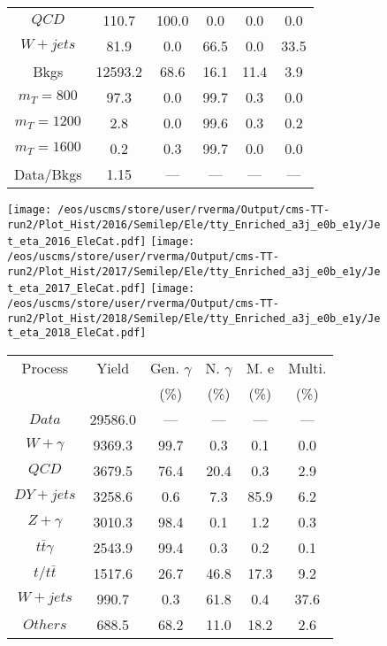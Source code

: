 \begin{figure}
\begin{minipage}[c]{0.32\textwidth}
{\begin{tabular}{cccccc}
$ QCD $ &  110.7 &  100.0 &  0.0 &  0.0 &  0.0\\
$ W+jets $ &  81.9 &  0.0 &  66.5 &  0.0 &  33.5\\
Bkgs &  12593.2 &  68.6 &  16.1 &  11.4 &  3.9\\
$ m_{T} = 800 $ &  97.3 &  0.0 &  99.7 &  0.3 &  0.0\\
$ m_{T} = 1200 $ &  2.8 &  0.0 &  99.6 &  0.3 &  0.2\\
$ m_{T} = 1600 $ &  0.2 &  0.3 &  99.7 &  0.0 &  0.0\\
Data/Bkgs &  1.15 &  --- &  --- &  --- &  ---\\
\hline
\end{tabular}
}
\end{minipage}
\end{figure}

\begin{figure}
\centering
\texttt{[image: /eos/uscms/store/user/rverma/Output/cms-TT-run2/Plot\_Hist/2016/Semilep/Ele/tty\_Enriched\_a3j\_e0b\_e1y/Jet\_eta\_2016\_EleCat.pdf]}
\texttt{[image: /eos/uscms/store/user/rverma/Output/cms-TT-run2/Plot\_Hist/2017/Semilep/Ele/tty\_Enriched\_a3j\_e0b\_e1y/Jet\_eta\_2017\_EleCat.pdf]}
\texttt{[image: /eos/uscms/store/user/rverma/Output/cms-TT-run2/Plot\_Hist/2018/Semilep/Ele/tty\_Enriched\_a3j\_e0b\_e1y/Jet\_eta\_2018\_EleCat.pdf]}
\begin{minipage}[c]{0.32\textwidth}
\centering
\tiny{
\begin{tabular}{cccccc}
\hline
Process & Yield & Gen. $\gamma$ & N. $\gamma$ & M. e & Multi. \\
 &  & (\%) & (\%) & (\%) & (\%)  \\
\hline
                                                                      $ Data $ &  29586.0 &  --- &  --- &  --- &  ---\\
$ W+\gamma $ &  9369.3 &  99.7 &  0.3 &  0.1 &  0.0\\
$ QCD $ &  3679.5 &  76.4 &  20.4 &  0.3 &  2.9\\
$ DY+jets $ &  3258.6 &  0.6 &  7.3 &  85.9 &  6.2\\
$ Z+\gamma $ &  3010.3 &  98.4 &  0.1 &  1.2 &  0.3\\
$ t\bar{t}\gamma $ &  2543.9 &  99.4 &  0.3 &  0.2 &  0.1\\
$ t/t\bar{t} $ &  1517.6 &  26.7 &  46.8 &  17.3 &  9.2\\
$ W+jets $ &  990.7 &  0.3 &  61.8 &  0.4 &  37.6\\
$ Others $ &  688.5 &  68.2 &  11.0 &  18.2 &  2.6\\

\end{tabular}}
\end{minipage}
\end{figure}
